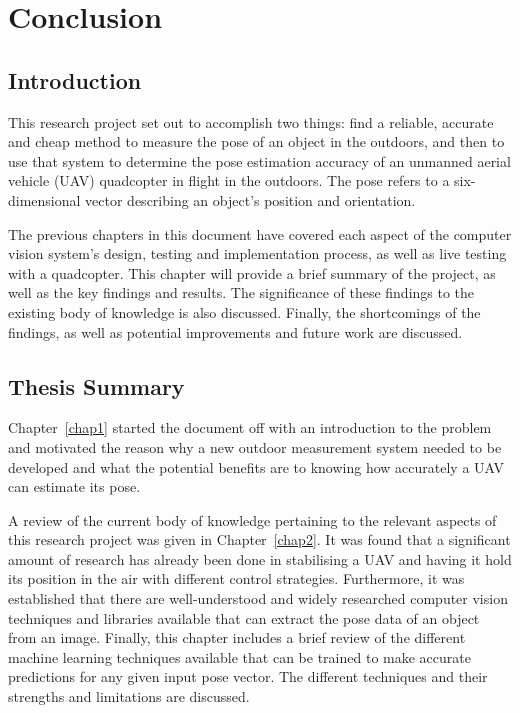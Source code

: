 \chapter{Conclusion}
\label{chap6}

\section{Introduction}

This research project set out to accomplish two things: find a reliable, accurate and cheap method to measure the pose of an object in the outdoors, and then to use that system to determine the pose estimation accuracy of an unmanned aerial vehicle (UAV) quadcopter in flight in the outdoors. The pose refers to a six-dimensional vector describing an object's position and orientation. 

The previous chapters in this document have covered each aspect of the computer vision system's design, testing and implementation process, as well as live testing with a quadcopter. This chapter will provide a brief summary of the project, as well as the key findings and results. The significance of these findings to the existing body of knowledge is also discussed. Finally, the shortcomings of the findings, as well as potential improvements and future work are discussed. 

\section{Thesis Summary}

Chapter~\ref{chap1} started the document off with an introduction to the problem and motivated the reason why a new outdoor measurement system needed to be developed and what the potential benefits are to knowing how accurately a UAV can estimate its pose.  

A review of the current body of knowledge pertaining to the relevant aspects of this research project was given in Chapter~\ref{chap2}. It was found that a significant amount of research has already been done in stabilising a UAV and having it hold its position in the air with different control strategies. Furthermore, it was established that there are well-understood and widely researched computer vision techniques and libraries available that can extract the pose data of an object from an image. Finally, this chapter includes a brief review of the different machine learning techniques available that can be trained to make accurate predictions for any given input pose vector. The different techniques and their strengths and limitations are discussed.  

